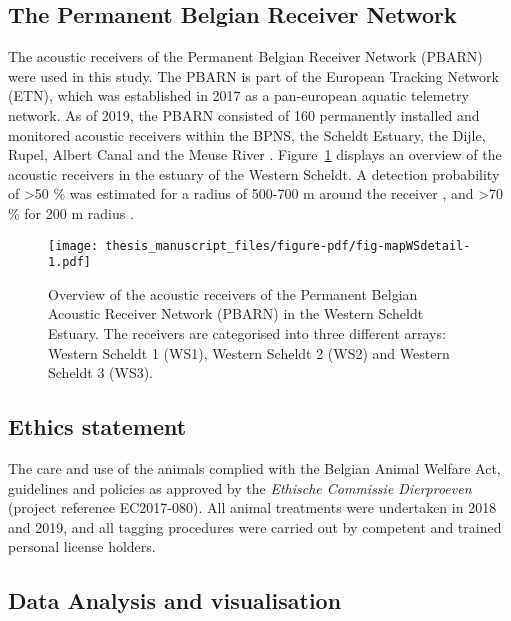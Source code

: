 \documentclass[
  authoryear,
  review,
  3p]{elsarticle}
\begin{document}
\hypertarget{the-permanent-belgian-receiver-network}{%
\subsection{The Permanent Belgian Receiver
Network}\label{the-permanent-belgian-receiver-network}}

The acoustic receivers of the Permanent Belgian Receiver Network (PBARN)
were used in this study. The PBARN is part of the European Tracking
Network (ETN), which was established in 2017 as a pan-european aquatic
telemetry network. As of 2019, the PBARN consisted of 160 permanently
installed and monitored acoustic receivers within the BPNS, the Scheldt
Estuary, the Dijle, Rupel, Albert Canal and the Meuse River
\citep{reubens_2018}. Figure~\ref{fig-mapWSdetail} displays an overview
of the acoustic receivers in the estuary of the Western Scheldt. A
detection probability of \textgreater50 \% was estimated for a radius of
500-700 m around the receiver \citep{goossens_2022}, and \textgreater70
\% for 200 m radius \citep{reubens_2018}.

\begin{figure}[H]

{\centering \texttt{[image: thesis\_manuscript\_files/figure-pdf/fig-mapWSdetail-1.pdf]}

}

\caption{\label{fig-mapWSdetail}Overview of the acoustic receivers of
the Permanent Belgian Acoustic Receiver Network (PBARN) in the Western
Scheldt Estuary. The receivers are categorised into three different
arrays: Western Scheldt 1 (WS1), Western Scheldt 2 (WS2) and Western
Scheldt 3 (WS3).}

\end{figure}

\hypertarget{ethics-statement}{%
\subsection{Ethics statement}\label{ethics-statement}}

The care and use of the animals complied with the Belgian Animal Welfare
Act, guidelines and policies as approved by the \emph{Ethische Commissie
Dierproeven} (project reference EC2017-080). All animal treatments were
undertaken in 2018 and 2019, and all tagging procedures were carried out
by competent and trained personal license holders.

\hypertarget{data-analysis-and-visualisation}{%
\subsection{Data Analysis and
visualisation}\label{data-analysis-and-visualisation}}
\end{document}
